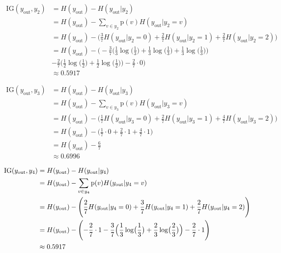 \documentclass[12pt]{article}
\newcommand{\info}[2]{\frac{#1}{#2}\log\bigl( \frac{#1}{#2} \bigr)}
\begin{document}
\begin{enumerate}[leftmargin=\labelsep]
\begin{equation}
    \begin{split}
        \textrm{IG}(y_\textrm{out}, y_2) &= H(y_\textrm{out}) - H(y_\textrm{out}|y_2) \\
        & = H(y_\textrm{out}) - \sum_{v \in y_2}\textrm{p}(v)H(y_\textrm{out}|y_2=v) \\
        & = H(y_\textrm{out}) - \Biggl( \frac{3}{7}H(y_\textrm{out}|y_2=0) + \frac{2}{7}H(y_\textrm{out}|y_2=1) + \frac{2}{7}H(y_\textrm{out}|y_2=2)\Biggr) \\
        & = H(y_\textrm{out}) - \Biggl( -\frac{3}{7}\biggl( \info{1}{3} + \info{1}{3} + \info{1}{3} \biggr) \\
        & - \frac{2}{7}\biggl( \info{1}{2} + \info{1}{2} \biggr) - \frac{2}{7} \cdot 0 \Biggr) \\
        & \approx 0.5917
    \end{split}
\end{equation}

\begin{equation}
    \begin{split}
        \textrm{IG}(y_\textrm{out}, y_3) &= H(y_\textrm{out}) - H(y_\textrm{out}|y_3) \\
        & = H(y_\textrm{out}) - \sum_{v \in y_3}\textrm{p}(v)H(y_\textrm{out}|y_3=v) \\
        & = H(y_\textrm{out}) - \Biggl( \frac{1}{7}H(y_\textrm{out}|y_3=0) + \frac{2}{7}H(y_\textrm{out}|y_3=1) + \frac{4}{7}H(y_\textrm{out}|y_3=2)\Biggr) \\
        & = H(y_\textrm{out}) - \Biggl( \frac{1}{7} \cdot 0 + \frac{2}{7} \cdot 1 + \frac{4}{7} \cdot 1  \Biggr) \\
        & = H(y_\textrm{out}) - \frac{6}{7} \\
        & \approx 0.6996
    \end{split}
\end{equation}

\begin{equation}
    \begin{split}
        \textrm{IG}(y_\textrm{out}, y_4) &= H(y_\textrm{out}) - H(y_\textrm{out}|y_4) \\
        & = H(y_\textrm{out}) - \sum_{v \in y_4}\textrm{p}(v)H(y_\textrm{out}|y_4=v) \\
        & = H(y_\textrm{out}) - \Biggl( \frac{2}{7}H(y_\textrm{out}|y_4=0) + \frac{3}{7}H(y_\textrm{out}|y_4=1) + \frac{2}{7}H(y_\textrm{out}|y_4=2)\Biggr) \\
        & = H(y_\textrm{out}) - \Biggl( -\frac{2}{7} \cdot 1 - \frac{3}{7}\Bigl( \info{1}{3} + \info{2}{3} \Bigr) - \frac{2}{7} \cdot 1\Biggr)\\
        & \approx 0.5917
    \end{split}
\end{equation}


\end{enumerate}
\end{document}
